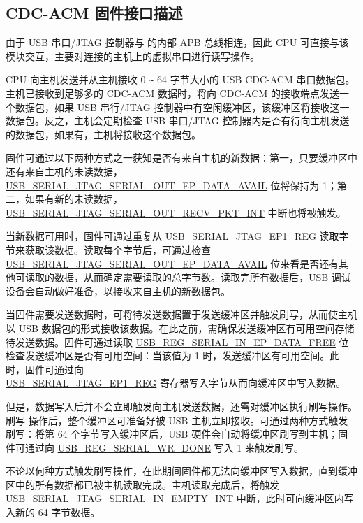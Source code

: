 \documentclass[main\_\_CN.tex]{subfiles}
\begin{document}
\subsection{CDC-ACM 固件接口描述}

由于 USB 串口/JTAG 控制器与 \chipname{} 的内部 APB 总线相连，因此 CPU 可直接与该模块交互，主要对连接的主机上的虚拟串口进行读写操作。

CPU 向主机发送并从主机接收 0 \verb+~+ 64 字节大小的 USB CDC-ACM 串口数据包。主机已接收到足够多的 CDC-ACM 数据时，将向 CDC-ACM 的接收端点发送一个数据包，如果 USB 串行/JTAG 控制器中有空闲缓冲区，该缓冲区将接收这一数据包。反之，主机会定期检查 USB 串口/JTAG 控制器内是否有待向主机发送的数据包，如果有，主机将接收这个数据包。

固件可通过以下两种方式之一获知是否有来自主机的新数据：第一，只要缓冲区中还有来自主机的未读数据，\hyperref[fielddesc:USBSERIALJTAGSERIALOUTEPDATAAVAIL]{USB\_SERIAL\_JTAG\_SERIAL\_OUT\_EP\_DATA\_AVAIL} 位将保持为 1；第二，如果有新的未读数据，\\\hyperref[fielddesc:USBSERIALJTAGSERIALOUTRECVPKTINTRAW]{USB\_SERIAL\_JTAG\_SERIAL\_OUT\_RECV\_PKT\_INT} 中断也将被触发。

当新数据可用时，固件可通过重复从 \hyperref[fielddesc:USBSERIALJTAGRDWRBYTE]{USB\_SERIAL\_JTAG\_EP1\_REG} 读取字节来获取该数据。读取每个字节后，可通过检查 \hyperref[fielddesc:USBSERIALJTAGSERIALOUTEPDATAAVAIL]{USB\_SERIAL\_JTAG\_SERIAL\_OUT\_EP\_DATA\_AVAIL} 位来看是否还有其他可读取的数据，从而确定需要读取的总字节数。读取完所有数据后，USB 调试设备会自动做好准备，以接收来自主机的新数据包。

当固件需要发送数据时，可将待发送数据置于发送缓冲区并触发刷写，从而使主机以 USB 数据包的形式接收该数据。在此之前，需确保发送缓冲区有可用空间存储待发送数据。固件可通过读取 \hyperref[fielddesc:USBSERIALJTAGSERIALINEPDATAFREE]{USB\_REG\_SERIAL\_IN\_EP\_DATA\_FREE} 位检查发送缓冲区是否有可用空间：当该值为 1 时，发送缓冲区有可用空间。此时，固件可通过向 \\\hyperref[fielddesc:USBSERIALJTAGRDWRBYTE]{USB\_SERIAL\_JTAG\_EP1\_REG} 寄存器写入字节从而向缓冲区中写入数据。

但是，数据写入后并不会立即触发向主机发送数据，还需对缓冲区执行刷写操作。刷写 操作后，整个缓冲区可准备好被 USB 主机立即接收。可通过两种方式触发刷写：将第 64 个字节写入缓冲区后，USB 硬件会自动将缓冲区刷写到主机；固件可通过向 \hyperref[fielddesc:USBSERIALJTAGWRDONE]{USB\_REG\_SERIAL\_WR\_DONE} 写入 1 来触发刷写。

不论以何种方式触发刷写操作，在此期间固件都无法向缓冲区写入数据，直到缓冲区中的所有数据都已被主机读取完成。主机读取完成后，将触发 \hyperref[fielddesc:USBSERIALJTAGSERIALINEMPTYINTRAW]{USB\_SERIAL\_JTAG\_SERIAL\_IN\_EMPTY\_INT} 中断，此时可向缓冲区内写入新的 64 字节数据。
\end{document}
